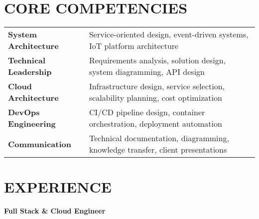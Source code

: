 \documentclass{fullstackdeveloper-ats}
\begin{document}
\section{CORE COMPETENCIES}
\begin{tabular}{p{4cm}p{13cm}}
\textbf{System Architecture} & Service-oriented design, event-driven systems, IoT platform architecture \\[0.2cm]
\textbf{Technical Leadership} & Requirements analysis, solution design, system diagramming, API design \\[0.2cm]
\textbf{Cloud Architecture} & Infrastructure design, service selection, scalability planning, cost optimization \\[0.2cm]
\textbf{DevOps Engineering} & CI/CD pipeline design, container orchestration, deployment automation \\[0.2cm]
\textbf{Communication} & Technical documentation, diagramming, knowledge transfer, client presentations \\
\end{tabular}

\section{EXPERIENCE}

\noindent\textbf{Full Stack \& Cloud Engineer} \hfill {}\\
\end{document}
